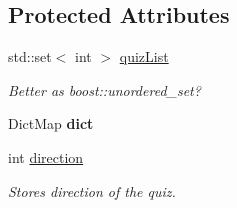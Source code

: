 \subsection*{Protected Attributes}
\begin{DoxyCompactItemize}
\item 
std::set$<$ int $>$ \hyperlink{classVocabQuiz_a294e44914f7766a1cdfff9ae87c722ff}{quizList}
\begin{DoxyCompactList}\small\item\em Better as boost::unordered\_\-set? \item\end{DoxyCompactList}\item 
\hypertarget{classVocabQuiz_af9090d47e0a1e8b3b40c39f55afd60a1}{
DictMap {\bfseries dict}}
\label{classVocabQuiz_af9090d47e0a1e8b3b40c39f55afd60a1}

\item 
\hypertarget{classVocabQuiz_aae316737b7faea73886cff3f88836585}{
int \hyperlink{classVocabQuiz_aae316737b7faea73886cff3f88836585}{direction}}
\label{classVocabQuiz_aae316737b7faea73886cff3f88836585}

\begin{DoxyCompactList}\small\item\em Stores direction of the quiz. \item\end{DoxyCompactList}\end{DoxyCompactItemize}


